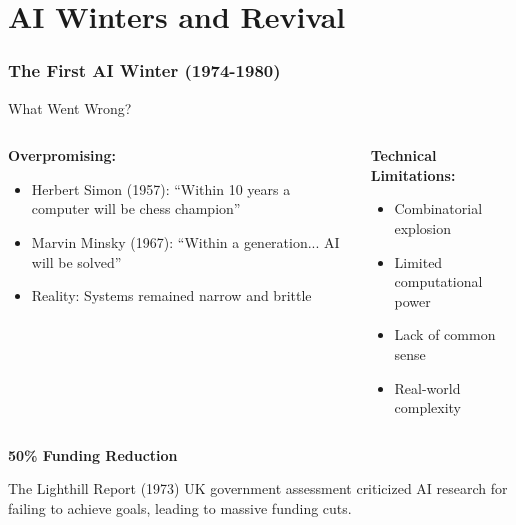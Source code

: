 \documentclass{beamer}
\begin{document}
\section{AI Winters and Revival}

\begin{frame}
    \frametitle{The First AI Winter (1974-1980)}
    \begin{alertblock}{What Went Wrong?}
        \begin{columns}
            \begin{column}{0.48\textwidth}
                \textbf{Overpromising:}
                \begin{itemize}
                    \item Herbert Simon (1957): ``Within 10 years a computer will be chess champion''
                    \item Marvin Minsky (1967): ``Within a generation... AI will be solved''
                    \item Reality: Systems remained narrow and brittle
                \end{itemize}
            \end{column}
            \begin{column}{0.48\textwidth}
                \textbf{Technical Limitations:}
                \begin{itemize}
                    \item Combinatorial explosion
                    \item Limited computational power
                    \item Lack of common sense
                    \item Real-world complexity
                \end{itemize}
            \end{column}
        \end{columns}
    \end{alertblock}
    
    \begin{center}
        \textcolor{MyBlue}{\textbf{\Large 50\% Funding Reduction}}
    \end{center}
    
    \begin{block}{The Lighthill Report (1973)}
        UK government assessment criticized AI research for failing to achieve goals, leading to massive funding cuts.
    \end{block}
\end{frame}
\end{document}
